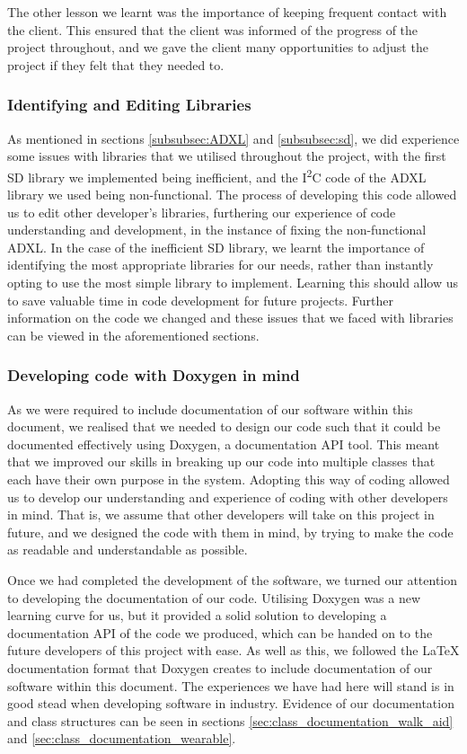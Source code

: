                 The other lesson we learnt was the importance of keeping frequent contact with the client. This ensured that the client was informed of the progress of the project throughout, and we gave the client many opportunities to adjust the project if they felt that they needed to.

            \subsubsection{Identifying and Editing Libraries}

                As mentioned in sections \ref{subsubsec:ADXL} and \ref{subsubsec:sd}, we did experience some issues with libraries that we utilised throughout the project, with the first SD library we implemented being inefficient, and the I\textsuperscript{2}C code of the ADXL library we used being non-functional. The process of developing this code allowed us to edit other developer's libraries, furthering our experience of code understanding and development, in the instance of fixing the non-functional ADXL. In the case of the inefficient SD library, we learnt the importance of identifying the most appropriate libraries for our needs, rather than instantly opting to use the most simple library to implement. Learning this should allow us to save valuable time in code development for future projects.
                Further information on the code we changed and these issues that we faced with libraries can be viewed in the aforementioned sections.

            \subsubsection{Developing code with Doxygen in mind}

                As we were required to include documentation of our software within this document, we realised that we needed to design our code such that it could be documented effectively using Doxygen, a documentation API tool. This meant that we improved our skills in breaking up our code into multiple classes that each have their own purpose in the system. Adopting this way of coding allowed us to develop our understanding and experience of coding with other developers in mind. That is, we assume that other developers will take on this project in future, and we designed the code with them in mind, by trying to make the code as readable and understandable as possible.

                Once we had completed the development of the software, we turned our attention to developing the documentation of our code. Utilising Doxygen was a new learning curve for us, but it provided a solid solution to developing a documentation API of the code we produced, which can be handed on to the future developers of this project with ease. As well as this, we followed the LaTeX documentation format that Doxygen creates to include documentation of our software within this document. The experiences we have had here will stand is in good stead when developing software in industry. Evidence of our documentation and class structures can be seen in sections \ref{sec:class_documentation_walk_aid} and \ref{sec:class_documentation_wearable}.

